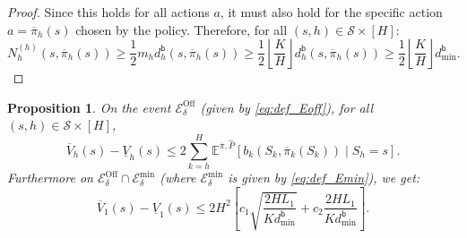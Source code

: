 \documentclass[twoside]{article}
\newtheorem{proposition}{Proposition}
\newcommand{\ohighv}{\overline{V}} %
\newcommand{\olowv}{\underline{V}} %
\begin{document}
\begin{proof}
Since this holds for all actions $a$, it must also hold for the specific action $a = \overline{\pi}_h(s)$ chosen by the policy. Therefore, for all $(s,h) \in \mathcal{S}\times[H]$:
\begin{equation*}
    N_h^{(h)}(s, \overline{\pi}_h(s)) \ge \dfrac{1}{2} m_h d^{\mathsf{b}}_h(s,\overline{\pi}_h(s)) \ge \frac{1}{2} \left \lfloor \frac{K}{H} \right \rfloor d^{\mathsf{b}}_h(s,\overline{\pi}_h(s)) \ge \frac{1}{2} \left \lfloor \frac{K}{H} \right \rfloor d^{\mathsf{b}}_{\min}.
\end{equation*}
\end{proof}

\begin{proposition}
\label{prop:offline_width}
On the event $\mathcal{E}^{\mathrm{Off}}_\delta$ (given by \eqref{eq:def_Eoff}), for all $(s,h)\in\mathcal{S}\times[H]$,
\begin{equation}
\label{eq:width_known_theo}
\ohighv_h(s)-\olowv_h(s)
\le
2\sum_{k=h}^{H}
\mathbb{E}^{\overline{\pi},\widehat{P}}\left[
b_k\left(S_k,\overline{\pi}_k(S_k)\right)\middle| S_h=s
\right].
\end{equation}
Furthermore on
$\mathcal{E}^{\mathrm{Off}}_\delta \cap \mathcal{E}^{\mathrm{min}}_\delta$ (where $\mathcal{E}^{\mathrm{min}}_\delta$ is given by \eqref{eq:def_Emin}),
we get: 
\begin{equation}
\label{eq:width_known_real}
\ohighv_1(s) - \olowv_1(s)
\le
2H^2\left[
c_1\sqrt{\frac{2HL_1}{Kd^{\mathsf{b}}_{\min}}}+c_2\frac{2HL_1}{K d^{\mathsf{b}}_{\min}}
\right].
\end{equation}
\end{proposition}
\end{document}
